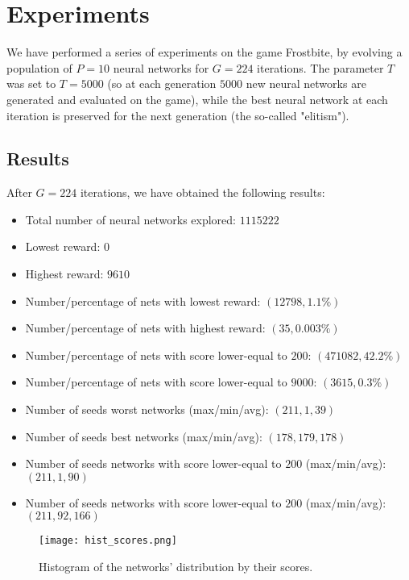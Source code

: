 \documentclass[11pt]{scrartcl} %
\begin{document}
\section{Experiments}

We have performed a series of experiments on the game Frostbite, by evolving a population of $P=10$ neural networks for $G=224$ iterations. The parameter $T$ was set to $T=5000$ (so at each generation $5000$ new neural networks are generated and evaluated on the game), while the best neural network at each iteration is preserved for the next generation (the so-called "elitism").

\subsection{Results}

After $G=224$ iterations, we have obtained the following results:
\begin{itemize}
	\item Total number of neural networks explored: $1115222$
	\item Lowest reward: $0$
	\item Highest reward: $9610$
	\item Number/percentage of nets with lowest reward: $(12798, 1.1\%)$
	\item Number/percentage of nets with highest reward: $(35, 0.003\%)$
	\item Number/percentage of nets with score lower-equal to $200$: $(471082, 42.2\%)$
	\item Number/percentage of nets with score lower-equal to $9000$: $(3615, 0.3\%)$
	\item Number of seeds worst networks (max/min/avg): $(211, 1, 39)$
	\item Number of seeds best networks (max/min/avg): $(178, 179, 178)$	
	\item Number of seeds networks with score lower-equal to $200$ (max/min/avg): $(211, 1, 90)$
	\item Number of seeds networks with score lower-equal to $200$ (max/min/avg): $(211, 92, 166)$
\end{itemize}

\begin{figure}[h] %
	\centering
	\texttt{[image: hist\_scores.png]} %
	\caption{ Histogram of the networks' distribution by their scores.}
\end{figure}
\end{document}
